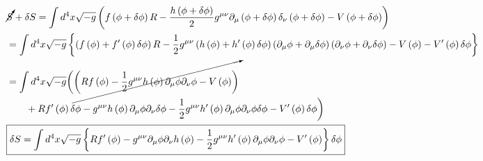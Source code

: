 \begin{align}
    &\cancelto{}S + \delta S = \int d^{4}x\sqrt{-g}\left(f\left(\phi + \delta\phi\right)R - \frac{h\left(\phi + \delta\phi\right)}{2}g^{\mu\nu}\partial_{\mu}\left(\phi + \delta\phi\right)\delta_{\nu}\left(\phi + \delta\phi\right) - V\left(\phi + \delta\phi\right)\right)\\
    &= \int d^{4}x\sqrt{-g}\left\{\left(f\left(\phi\right) + f^{\prime}\left(\phi\right)\delta\phi\right)R - \frac{1}{2}g^{\mu\nu}\left(h\left(\phi\right) + h^{\prime}\left(\phi\right)\delta\phi\right)\left(\partial_{\mu}\phi + \partial_{\mu}\delta\phi\right)\left(\partial_{\nu}\phi + \partial_{\nu}\delta\phi\right) - V\left(\phi\right) - V^{\prime}\left(\phi\right)\delta\phi\right\}\\
    &= \int d^{4}x\sqrt{-g}\bigg(\cancelto{}{\left(Rf\left(\phi\right) - \frac{1}{2}g^{\mu\nu}h\left(\phi\right)\partial_{\mu}\phi\partial_{\nu}\phi - V\left(\phi\right)\right)} \\
    &\quad\quad + Rf^{\prime}\left(\phi\right)\delta\phi - g^{\mu\nu}h\left(\phi\right)\partial_{\mu}\phi\partial_{\nu}\delta\phi - \frac{1}{2}g^{\mu\nu}h^{\prime}\left(\phi\right)\partial_{\mu}\phi\partial_{\nu}\phi\delta\phi- V^{\prime}\left(\phi\right)\delta\phi\bigg)\\
    &\boxed{\delta S = \int d^{4}x\sqrt{-g}\left\{Rf^{\prime}\left(\phi\right) - g^{\mu\nu}\partial_{\mu}\phi\partial_{\nu}h\left(\phi\right) - \frac{1}{2}g^{\mu\nu}h^{\prime}\left(\phi\right)\partial_{\mu}\phi\partial_{\nu}\phi - V^{\prime}\left(\phi\right)\right\}\delta\phi}
\end{align}

